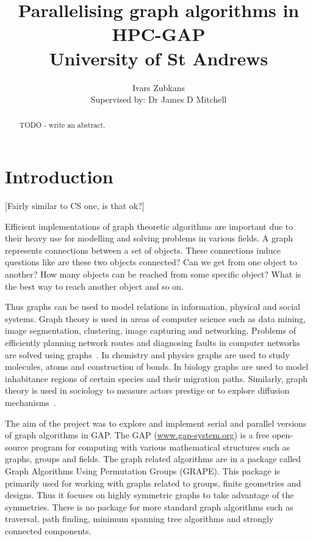 \documentclass{report}
\title{Parallelising graph algorithms in HPC-GAP \\ \vspace{2 mm} {\large University of St Andrews}}
\author{Ivars Zubkans \\ \small Supervised by: Dr James D Mitchell}
\theoremstyle{plain}
\theoremstyle{definition}
\theoremstyle{remark}
\numberwithin{definition}{chapter}
\numberwithin{example}{chapter}
\numberwithin{figure}{chapter}
\numberwithin{theorem}{chapter}
\numberwithin{lemma}{chapter}
\begin{document}
\maketitle

\begin{abstract}

TODO - write an abstract.

\end{abstract}

\tableofcontents

\chapter{Introduction}

[Fairly similar to CS one, is that ok?]

Efficient implementations of graph theoretic algorithms are important due to their heavy use for modelling and solving problems in various fields. A graph represents connections between a set of objects. These connections induce questions like are these two objects connected? Can we get from one object to another? How many objects can be reached from some specific object? What is the best way to reach another object and so on.

Thus graphs can be used to model relations in information, physical and social systems. Graph theory is used in areas of computer science such as data mining, image segmentation, clustering, image capturing and networking. Problems of efficiently planning network routes and diagnosing faults in computer networks are solved using graphs~\cite{6005872}. In chemistry and physics graphs are used to study molecules, atoms and construction of bonds. In biology graphs are used to model inhabitance regions of certain species and their migration paths. Similarly, graph theory is used in sociology to measure actors prestige or to explore diffusion mechanisms~\cite{shirinivas2010applications}.

The aim of the project was to explore and implement serial and parallel versions of graph algorithms in GAP. The GAP (\url{www.gap-system.org}) is a free open-source program for computing with various mathematical structures such as graphs, groups and fields. The graph related algorithms are in a package called Graph Algorithms Using Permutation Groups (GRAPE). This package is primarily used for working with graphs related to groups, finite geometries and designs. Thus it focuses on highly symmetric graphs to take advantage of the symmetries. There is no package for more standard graph algorithms such as traversal, path finding, minimum spanning tree algorithms and strongly connected components.
\end{document}
